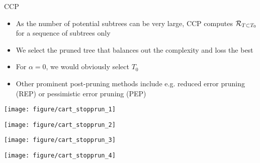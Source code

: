 \documentclass[11pt,compress,t,notes=noshow, xcolor=table]{beamer}
\begin{document}
\begin{vbframe}{CCP}

\begin{itemize}
\item As the number of potential subtrees can be very large, CCP computes $\mathcal{R}_{T \subset T_0}$ for a sequence of subtrees only
\item We select the pruned tree that balances out the complexity and loss the best
\item For $\alpha = 0$, we would obviously select $T_0$
\item Other prominent post-pruning methods include e.g. reduced error pruning (REP) or pessimistic error pruning (PEP)
\end{itemize}

\framebreak

\begin{knitrout}\scriptsize
{}\color{fgcolor}

{\centering \texttt{[image: figure/cart\_stopprun\_1]} 

}




{\centering \texttt{[image: figure/cart\_stopprun\_2]} 

}




{\centering \texttt{[image: figure/cart\_stopprun\_3]} 

}




{\centering \texttt{[image: figure/cart\_stopprun\_4]} 

}



\end{knitrout}
\end{vbframe}



\endlecture
\end{document}

